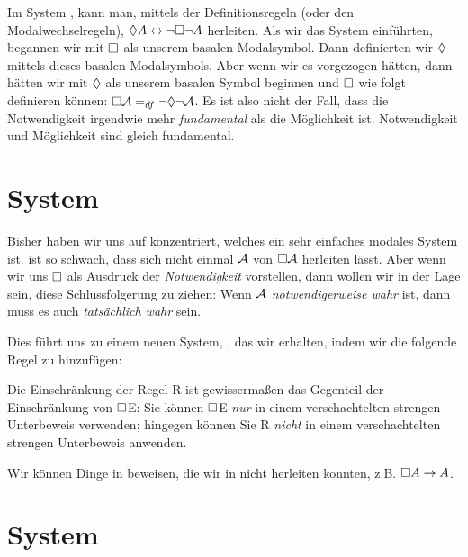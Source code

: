 Im System \mlK, kann man, mittels der Definitionsregeln (oder den Modalwechselregeln), $\Diamond A \leftrightarrow \neg\Box\neg A$ herleiten. Als wir das System \mlK{} einführten, begannen wir mit $\Box$ als unserem basalen Modalsymbol. Dann definierten wir $\Diamond$ mittels dieses basalen Modalsymbols. Aber wenn wir es vorgezogen hätten, dann hätten wir mit $\Diamond$ als unserem basalen Symbol beginnen und $\Box$ wie folgt definieren können: $\Box\mathcal{A} =_{df} \neg \Diamond \neg \mathcal{A}$. Es ist also nicht der Fall, dass die Notwendigkeit irgendwie mehr \emph{fundamental} als die Möglichkeit ist. Notwendigkeit und Möglichkeit sind gleich fundamental.

\section{System \mlT}
\label{T}

Bisher haben wir uns auf \mlK{} konzentriert, welches ein sehr einfaches modales System ist. \mlK{} ist so schwach, dass sich nicht einmal $\mathcal{A}$ von $\Box\mathcal{A}$ herleiten lässt. Aber wenn wir uns $\Box$ als Ausdruck der \emph{Notwendigkeit} vorstellen, dann wollen wir in der Lage sein, diese Schlussfolgerung zu ziehen: Wenn $\mathcal{A}$ \emph{notwendigerweise wahr} ist, dann muss es auch \emph{tatsächlich wahr} sein.

Dies führt uns zu einem neuen System, \mlT, das wir erhalten, indem wir die folgende Regel zu \mlK{} hinzufügen:

Die Einschränkung der Regel R\mlT{} ist gewisserma{\ss}en das Gegenteil der Einschränkung von $\Box$E: Sie können $\Box$E \emph{nur} in einem verschachtelten strengen Unterbeweis verwenden; hingegen können Sie R\mlT{} \emph{nicht} in einem verschachtelten strengen Unterbeweis anwenden.

Wir können Dinge in \mlT{} beweisen, die wir in \mlK{} nicht herleiten konnten, z.B. $\Box A \rightarrow A$.

\section{System \mlSfour}
\label{S4}

